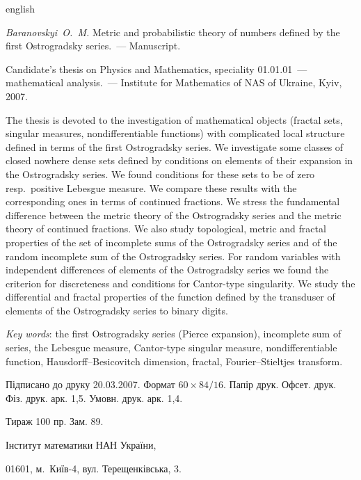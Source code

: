 \documentclass{vakaref}
\theoremstyle{plain}
\theoremstyle{definition}
\theoremstyle{remark}
\begin{document}
\begin{otherlanguage*}{english}

\emph{Baranovskyi~O.~M.} Metric and probabilistic theory of
numbers defined by the first Ostrogradsky series.~--- Manuscript.

Candidate's thesis on Physics and Mathematics, speciality
01.01.01~--- mathematical analysis.~--- Institute for Mathematics
of NAS of Ukraine, Kyiv, 2007.

\smallskip

The thesis is devoted to the investigation of mathematical objects
(fractal sets, singular measures, nondifferentiable functions)
with complicated local structure defined in terms of the first
Ostrogradsky series. We investigate some classes of closed nowhere
dense sets defined by conditions on elements of their expansion in
the Ostrogradsky series. We found conditions for these sets to be
of zero resp.\ positive Lebesgue measure. We compare these results
with the corresponding ones in terms of continued fractions. We
stress the fundamental difference between the metric theory of the
Ostrogradsky series and the metric theory of continued fractions.
We also study topological, metric and fractal properties of the
set of incomplete sums of the Ostrogradsky series and of the
random incomplete sum of the Ostrogradsky series. For random
variables with independent differences of elements of the
Ostrogradsky series we found the criterion for discreteness and
conditions for Cantor-type singularity. We study the differential
and fractal properties of the function defined by the transduser
of elements of the Ostrogradsky series to binary digits.

\smallskip

\emph{Key words}: the first Ostrogradsky series (Pierce
expansion), incomplete sum of series, the Lebesgue measure,
Cantor-type singular measure, nondifferentiable function,
Hausdorff--Besicovitch dimension, fractal, Fourier--Stieltjes
transform.

\end{otherlanguage*}

\parindent0pt

\hbox{}
\vfill

\hrulefill

Підписано до друку 20.03.2007. Формат $60\times84/16$. Папір друк.
Офсет. друк. Фіз. друк. арк. 1,5. Умовн. друк. арк. 1,4.

Тираж 100 пр. Зам. 89.

\hrulefill

Інститут математики НАН України,

01601, м.~Київ-4, вул. Терещенківська, 3.
\end{document}
